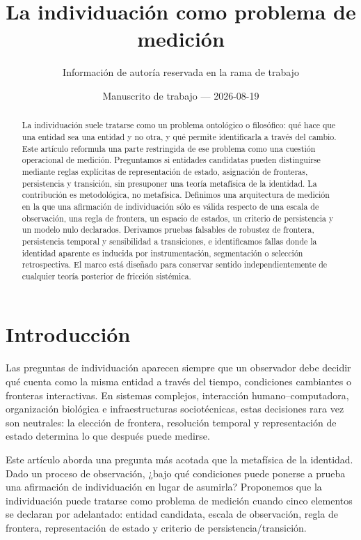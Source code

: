 \documentclass[11pt]{article}
\title{La individuación como problema de medición}
\author{Información de autoría reservada en la rama de trabajo}
\date{Manuscrito de trabajo --- 2026-08-19}
\begin{document}
\maketitle

\begin{abstract}
La individuación suele tratarse como un problema ontológico o filosófico: qué hace que una entidad sea una entidad y no otra, y qué permite identificarla a través del cambio. Este artículo reformula una parte restringida de ese problema como una cuestión operacional de medición. Preguntamos si entidades candidatas pueden distinguirse mediante reglas explícitas de representación de estado, asignación de fronteras, persistencia y transición, sin presuponer una teoría metafísica de la identidad. La contribución es metodológica, no metafísica. Definimos una arquitectura de medición en la que una afirmación de individuación sólo es válida respecto de una escala de observación, una regla de frontera, un espacio de estados, un criterio de persistencia y un modelo nulo declarados. Derivamos pruebas falsables de robustez de frontera, persistencia temporal y sensibilidad a transiciones, e identificamos fallas donde la identidad aparente es inducida por instrumentación, segmentación o selección retrospectiva. El marco está diseñado para conservar sentido independientemente de cualquier teoría posterior de fricción sistémica.
\end{abstract}

\section{Introducción}
Las preguntas de individuación aparecen siempre que un observador debe decidir qué cuenta como la misma entidad a través del tiempo, condiciones cambiantes o fronteras interactivas. En sistemas complejos, interacción humano--computadora, organización biológica e infraestructuras sociotécnicas, estas decisiones rara vez son neutrales: la elección de frontera, resolución temporal y representación de estado determina lo que después puede medirse.

Este artículo aborda una pregunta más acotada que la metafísica de la identidad. Dado un proceso de observación, ¿bajo qué condiciones puede ponerse a prueba una afirmación de individuación en lugar de asumirla? Proponemos que la individuación puede tratarse como problema de medición cuando cinco elementos se declaran por adelantado: entidad candidata, escala de observación, regla de frontera, representación de estado y criterio de persistencia/transición.
\end{document}
